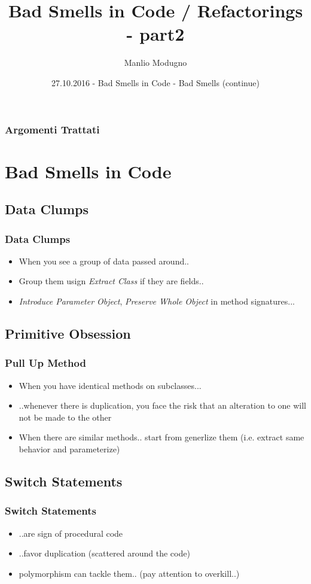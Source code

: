 \documentclass{beamer}
\title{Bad Smells in Code / Refactorings - part2}
\author{Manlio Modugno}
\institute[GMTechnologies]
\date[27.10.2016] 
{27.10.2016 - Bad Smells in Code - Bad Smells (continue)}
\begin{document}
\begin{frame}
  \titlepage
\end{frame}

\begin{frame}
  \frametitle{Argomenti Trattati}
  \tableofcontents
\end{frame}

\section{Bad Smells in Code}
\subsection{Data Clumps}
\begin{frame}
  \frametitle{Data Clumps}
  \begin{itemize}
	\item<+-> When you see a group of data passed around..
	\item<+-> Group them usign \textit{Extract Class} if they are fields..
	\item<+-> \textit{Introduce Parameter Object}, \textit{Preserve Whole Object} in method signatures...
  \end{itemize}
\end{frame}

\subsection{Primitive Obsession}
\begin{frame}
  \frametitle{Pull Up Method}
  \begin{itemize}
	\item<+-> When you have identical methods on subclasses...
	\item<+-> ..whenever there is duplication, you face the risk that an alteration to one will not be made to the other
	\item<+-> When there are similar methods.. start from generlize them (i.e. extract same behavior and parameterize)
  \end{itemize}
\end{frame}

\subsection{Switch Statements}
\begin{frame}
  \frametitle{Switch Statements}
  \begin{itemize}
	\item<+-> ..are sign of procedural code
	\item<+-> ..favor duplication (scattered around the code)
	\item<+-> polymorphism can tackle them.. (pay attention to overkill..)
  \end{itemize}
\end{frame}
\end{document}
